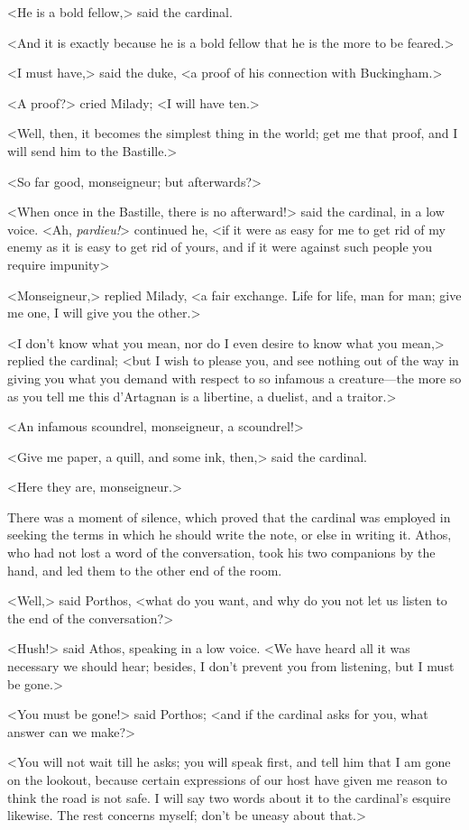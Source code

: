 <He is a bold fellow,> said the cardinal. 

<And it is exactly because he is a bold fellow that he is the more to be feared.> 

<I must have,> said the duke, <a proof of his connection with Buckingham.> 

<A proof?> cried Milady; <I will have ten.> 

<Well, then, it becomes the simplest thing in the world; get me that proof, and I will send him to the Bastille.> 

<So far good, monseigneur; but afterwards?> 

<When once in the Bastille, there is no afterward!> said the cardinal, in a low voice. <Ah, \textit{pardieu!}> continued he, <if it were as easy for me to get rid of my enemy as it is easy to get rid of yours, and if it were against such people you require impunity\longdash> 

<Monseigneur,> replied Milady, <a fair exchange. Life for life, man for man; give me one, I will give you the other.> 

<I don't know what you mean, nor do I even desire to know what you mean,> replied the cardinal; <but I wish to please you, and see nothing out of the way in giving you what you demand with respect to so infamous a creature---the more so as you tell me this d'Artagnan is a libertine, a duelist, and a traitor.> 

<An infamous scoundrel, monseigneur, a scoundrel!> 

<Give me paper, a quill, and some ink, then,> said the cardinal. 

<Here they are, monseigneur.> 

There was a moment of silence, which proved that the cardinal was employed in seeking the terms in which he should write the note, or else in writing it. Athos, who had not lost a word of the conversation, took his two companions by the hand, and led them to the other end of the room. 

<Well,> said Porthos, <what do you want, and why do you not let us listen to the end of the conversation?> 

<Hush!> said Athos, speaking in a low voice. <We have heard all it was necessary we should hear; besides, I don't prevent you from listening, but I must be gone.> 

<You must be gone!> said Porthos; <and if the cardinal asks for you, what answer can we make?> 

<You will not wait till he asks; you will speak first, and tell him that I am gone on the lookout, because certain expressions of our host have given me reason to think the road is not safe. I will say two words about it to the cardinal's esquire likewise. The rest concerns myself; don't be uneasy about that.> 

